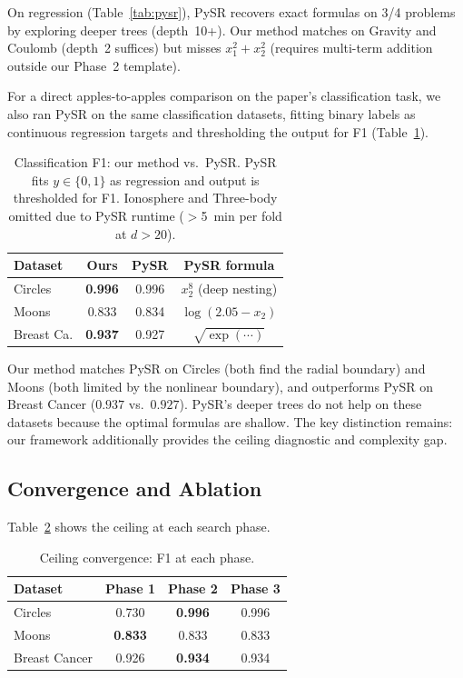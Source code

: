 \documentclass[journal]{IEEEtran}
\begin{document}
On regression (Table~\ref{tab:pysr}), PySR recovers exact formulas on
3/4 problems by exploring deeper trees (depth~10+). Our method matches
on Gravity and Coulomb (depth~2 suffices) but misses $x_1^2 + x_2^2$
(requires multi-term addition outside our Phase~2 template).

For a direct apples-to-apples comparison on the paper's classification
task, we also ran PySR on the same classification datasets, fitting
binary labels as continuous regression targets and thresholding the
output for F1 (Table~\ref{tab:pysr_class}).

\begin{table}[h]
\caption{Classification F1: our method vs.\ PySR. PySR fits
$y \in \{0,1\}$ as regression and output is thresholded for F1.
Ionosphere and Three-body omitted due to PySR runtime ($>$5~min
per fold at $d > 20$).}
\label{tab:pysr_class}
\scriptsize
\begin{tabular}{@{}lccc@{}}
\toprule
Dataset & Ours & PySR & PySR formula \\
\midrule
Circles & \textbf{0.996} & 0.996 & $x_2^8$ (deep nesting) \\
Moons & 0.833 & 0.834 & $\log(2.05 - x_2)$ \\
Breast Ca. & \textbf{0.937} & 0.927 & $\sqrt{\exp(\cdots)}$ \\
\bottomrule
\end{tabular}
\end{table}

Our method matches PySR on Circles (both find the radial boundary)
and Moons (both limited by the nonlinear boundary), and outperforms
PySR on Breast Cancer ($0.937$ vs.\ $0.927$). PySR's deeper trees do
not help on these datasets because the optimal formulas are shallow.
The key distinction remains: our framework additionally provides the
ceiling diagnostic and complexity gap.

\subsection{Convergence and Ablation}

Table~\ref{tab:convergence} shows the ceiling at each search phase.

\begin{table}[h]
\caption{Ceiling convergence: F1 at each phase.}
\label{tab:convergence}
\small
\begin{tabular}{lccc}
\toprule
Dataset & Phase 1 & Phase 2 & Phase 3 \\
\midrule
Circles & 0.730 & \textbf{0.996} & 0.996 \\
Moons & \textbf{0.833} & 0.833 & 0.833 \\
Breast Cancer & 0.926 & \textbf{0.934} & 0.934 \\
\bottomrule
\end{tabular}
\end{table}
\end{document}
